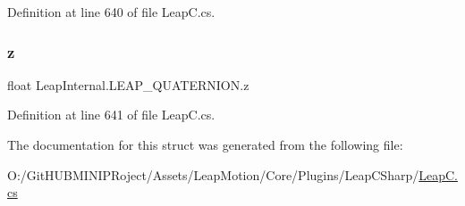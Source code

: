 Definition at line 640 of file Leap\+C.\+cs.

\mbox{\label{struct_leap_internal_1_1_l_e_a_p___q_u_a_t_e_r_n_i_o_n_a929a6fe22258fab61778eba9bc2390af}} 
\subsubsection{\texorpdfstring{z}{z}}
{\footnotesize\ttfamily float Leap\+Internal.\+L\+E\+A\+P\+\_\+\+Q\+U\+A\+T\+E\+R\+N\+I\+O\+N.\+z}



Definition at line 641 of file Leap\+C.\+cs.



The documentation for this struct was generated from the following file\+:\begin{DoxyCompactItemize}
\item 
O\+:/\+Git\+H\+U\+B\+M\+I\+N\+I\+P\+Roject/\+Assets/\+Leap\+Motion/\+Core/\+Plugins/\+Leap\+C\+Sharp/\mbox{\hyperlink{_leap_c_8cs}{Leap\+C.\+cs}}\end{DoxyCompactItemize}

